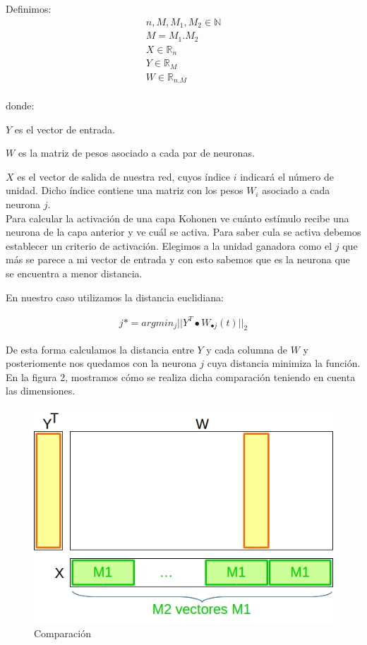 Definimos:
\begin{align*}
	n, M, M_{1}, M_{2} \in \mathbb{N} \\
	M = M_{1} . M_{2} \\
	X \in \mathbb{R}_{n} \\
	Y \in \mathbb{R}_{M} \\
	W \in \mathbb{R}_{n.M} \\
\end{align*}

donde:

$Y$ es el vector de entrada.

$W$ es la matriz de pesos asociado a cada par de neuronas. 

$X$ es el vector de salida de nuestra red, cuyos índice $i$ indicará el número de unidad. Dicho índice contiene una matriz con
 los pesos $W_{i}$ asociado a cada neurona $j$.\\

Para calcular la activación de una capa Kohonen ve cuánto estímulo recibe una neurona de la capa anterior y ve cuál se activa.
Para saber cula se activa debemos establecer un criterio de activación. Elegimos a la unidad ganadora como el $j$ que más se 
parece a mi vector de entrada y con esto sabemos que es la neurona que se encuentra a menor distancia. 

En nuestro caso utilizamos la distancia euclidiana:

\begin{align*}
		j* = argmin_{j}||Y^{T} \bullet W_{\bullet j}(t)||_{2}
\end{align*}

De esta forma calculamos la distancia entre $Y$ y cada columna de $W$ y posteriomente nos quedamos con la neurona $j$ 
cuya distancia minimiza la función. En la figura 2, mostramos cómo se realiza dicha comparación teniendo en cuenta las dimensiones.

\newpage

\begin{figure}[ht!]
	\centering
	\includegraphics[width=0.7\linewidth]{img/parte2-comparacion.jpg}
	\caption{Comparación}
\end{figure}

